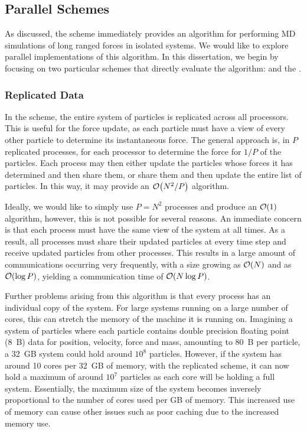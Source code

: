 \subsection{Parallel Schemes}

%
As discussed, the \velocityverlet{} scheme
immediately provides an algorithm for
performing MD simulations of long ranged forces in isolated systems.
%
We would like to explore parallel implementations of this algorithm.
%
In this dissertation, we begin by focusing on two particular schemes
that directly evaluate the \velocityverlet{} algorithm:
\replicateddata{} and the \systolicloop{}.



\subsubsection{Replicated Data}
\label{sec:background:subsec:replicated_data}

%
In the \replicateddata{} scheme,
the entire system of particles is replicated across all processors.
%
This is useful for the force update, as each particle must have a view of
every other particle to determine its instantaneous force.
%
The general approach is, in $P$ replicated processes, for each processor
to determine the force for $1/P$ of the particles.
%
Each process may then either update the particles whose forces it has
determined and then share them, or share them and then update the entire
list of particles.
%
In this way, it may provide an $\mathcal{O}{\left({ N^2/P }\right)}$ algorithm.

%
Ideally, we would like to simply use $P = N^2$ processes and produce an
$\mathcal{O}{\left({ 1 }\right)}$ algorithm, however, this is not possible for several reasons.
%
An immediate concern is that each process must have the same view of the
system at all times.
%
As a result, all processes must share their updated particles at
every time step and receive updated particles from other processes.
%
This results in a large amount of communications occurring very frequently,
with a size growing as $\mathcal{O}{\left({ N }\right)}$ and as $\mathcal{O}{\left({ \log{P} }\right)}$,
yielding a communication time of $\mathcal{O}{\left({ N \log{P} }\right)}$.

Further problems arising from this algorithm is that every process has
an individual copy of the system.
%
For large systems running on a large number of cores,
this can stretch the memory of the machine it is running on.
%
Imagining a system of particles where each particle contains double
precision floating point (8~B) data for position, velocity, force and mass,
amounting to 80~B per particle, a 32~GB system could hold around $10^8$
particles.
%
However, if the system has around 10 cores per 32~GB of memory,
with the replicated scheme,
it can now hold a maximum of around $10^7$ particles
as each core will be holding a full system.
%
Essentially, the maximum size of the system becomes inversely proportional
to the number of cores used per GB of memory.
%
This increased use of memory can cause other issues such as poor caching
due to the increased memory use.


